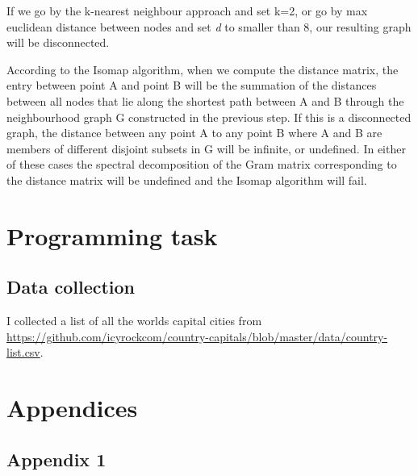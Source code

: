 \documentclass[11pt,a4paper,landscape]{article}
\begin{document}

If we go by the k-nearest neighbour approach and set k=2, or go by max euclidean distance between nodes and set \textit{d} to smaller than 8, our resulting graph will be disconnected.


According to the Isomap algorithm, when we compute the distance matrix, the entry between point A and point B will be the summation of the distances between all nodes that lie along the shortest path between A and B through the neighbourhood graph G constructed in the previous step. If this is a disconnected graph, the distance between any point A to any point B where A and B are members of different disjoint subsets in G will be infinite, or undefined. In either of these cases the spectral decomposition of the Gram matrix corresponding to the distance matrix will be undefined and the Isomap algorithm will fail.


\section{Programming task}

\subsection{Data collection}
I collected a list of all the worlds capital cities from \url{https://github.com/icyrockcom/country-capitals/blob/master/data/country-list.csv}.




\section{Appendices}
\subsection{Appendix 1}

\end{document}
